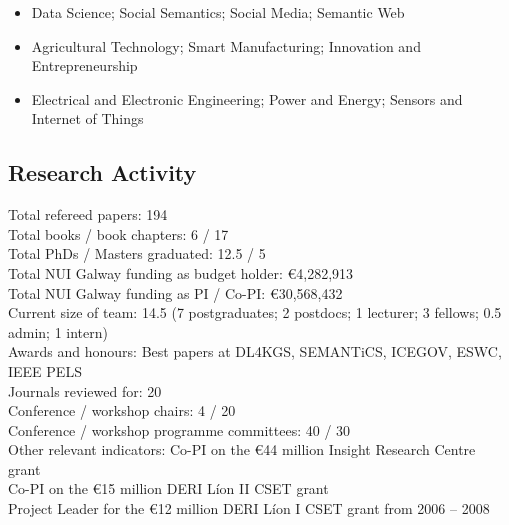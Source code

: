 \documentclass[10pt,a4paper]{res} %
\begin{document}
\begin{resume}
\begin{itemize} \itemsep -2pt
\item Data Science; Social Semantics; Social Media; Semantic Web
\item Agricultural Technology; Smart Manufacturing; Innovation and Entrepreneurship
\item Electrical and Electronic Engineering; Power and Energy; Sensors and Internet of Things
\end{itemize}

\subsection*{Research Activity}

\begin{center}
Total refereed papers: \hfill 194 \\
Total books / book chapters: \hfill 6 / 17 \\
Total PhDs / Masters graduated: \hfill 12.5 / 5 \\
Total NUI Galway funding as budget holder: \hfill \euro{}4,282,913 \\
Total NUI Galway funding as PI / Co-PI: \hfill \euro{}30,568,432 \\
Current size of team: \hfill 14.5 (7 postgraduates; 2 postdocs; 1 lecturer; 3 fellows; 0.5 admin; 1 intern) \\
Awards and honours: \hfill Best papers at DL4KGS, SEMANTiCS, ICEGOV, ESWC, IEEE PELS \\
Journals reviewed for: \hfill 20 \\
Conference / workshop chairs: \hfill 4 / 20 \\
Conference / workshop programme committees: \hfill 40 / 30 \\
Other relevant indicators: \hfill Co-PI on the \euro{}44 million Insight Research Centre grant \\ \hfill Co-PI on the \euro{}15 million DERI L\'{i}on II CSET grant \\ \hfill Project Leader for the \euro{}12 million DERI L\'{i}on I CSET grant from 2006 -- 2008
\end{center}


\vspace{0.2in} %



\end{resume}
\end{document}
